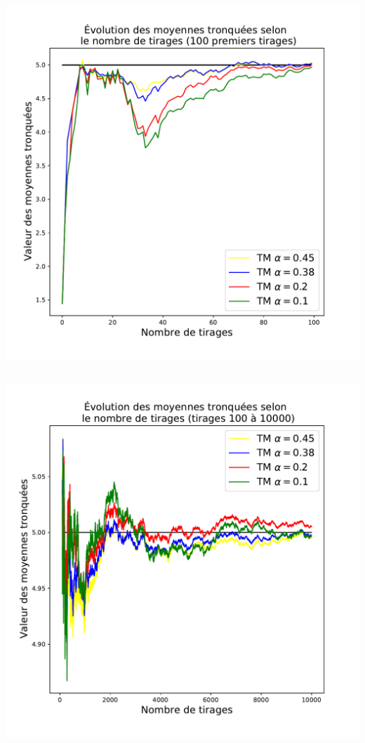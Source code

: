 \documentclass[8pt, sans]{beamer}
\begin{document}
\begin{frame}
\begin{columns}[T]
\begin{column}{0.5\linewidth}
\includegraphics[scale=0.2]{mt-100.pdf}

\end{column}

\end{columns}

\pause

\begin{columns}[T] %

\begin{column}{0.5\linewidth}

\includegraphics[scale=0.2]{mt-100-10000.pdf}


\end{column}
\end{columns}
\end{frame}
\end{document}
